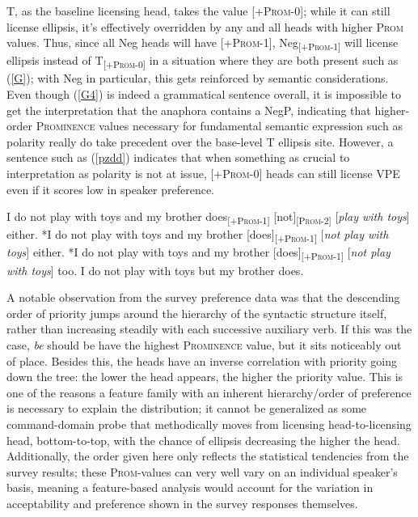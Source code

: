 \documentclass[11pt, oneside]{article}
\begin{document}
T, as the baseline licensing head, takes the value \textsc{[+Prom-0]}; while it can still license ellipsis, it's effectively overridden by any and all heads with higher \textsc{Prom} values. Thus, since all Neg heads will have \textsc{[+Prom-1]}, Neg\textsubscript{\textsc{[+Prom-1]}} will license ellipsis instead of T\textsubscript{\textsc{[+Prom-0]}} in a situation where they are both present such as (\ref{G}); with Neg in particular, this gets reinforced by semantic considerations. Even though (\ref{G4}) is indeed a grammatical sentence overall, it is impossible to get the interpretation that the anaphora contains a NegP, indicating that higher-order \textsc{Prominence} values necessary for fundamental semantic expression such as polarity really do take precedent over the base-level T ellipsis site. However, a sentence such as (\ref{pzdd}) indicates that when something as crucial to interpretation as polarity is not at issue, [+\textsc{Prom-0}] heads can still license VPE even if it scores low in speaker preference.

\begin{exe}
\ex\label{G}\begin{xlist}
	\ex\label{G1}	I do not play with toys and my brother does\textsubscript{\textsc{[+Prom-1]}} [not]\textsubscript{\textsc{[Prom-2]}} [\textit{play with toys}] either.
	\ex\label{G2}	*I do not play with toys and my brother [does]\textsubscript{\textsc{[+Prom-1]}} [\textit{not play with toys}] either.
	\ex\label{G3}	*I do not play with toys and my brother [does]\textsubscript{\textsc{[+Prom-1]}} [\textit{not play with toys}] too.
	\ex\label{G4}	I do not play with toys but my brother does.
	\end{xlist}
\end{exe}

A notable observation from the survey preference data was that the descending order of priority jumps around the hierarchy of the syntactic structure itself, rather than increasing steadily with each successive auxiliary verb. If this was the case, \textit{be} should be have the highest \textsc{Prominence} value, but it sits noticeably out of place. Besides this, the heads have an inverse correlation with priority going down the tree: the lower the head appears, the higher the priority value. This is one of the reasons a feature family with an inherent hierarchy/order of preference is necessary to explain the distribution; it cannot be generalized as some command-domain probe that methodically moves from licensing head-to-licensing head, bottom-to-top, with the chance of ellipsis decreasing the higher the head. Additionally, the order given here only reflects the statistical tendencies from the survey results; these \textsc{Prom}-values can very well vary on an individual speaker's basis, meaning a feature-based analysis would account for the variation in acceptability and preference shown in the survey responses themselves.
\end{document}
